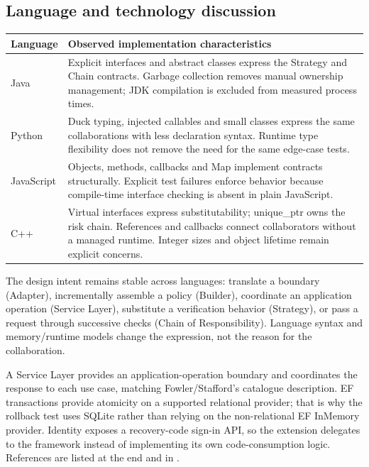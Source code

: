 \documentclass[11pt,a4paper]{article}
\newcommand{\code}[1]{\texttt{\detokenize{#1}}}
\begin{document}
\subsection{Language and technology discussion}
\begin{tabularx}{\linewidth}{@{}p{29mm}L@{}}\toprule
Language & Observed implementation characteristics\\\midrule
Java & Explicit interfaces and abstract classes express the Strategy and Chain contracts. Garbage collection removes manual ownership management; JDK compilation is excluded from measured process times.\\
Python & Duck typing, injected callables and small classes express the same collaborations with less declaration syntax. Runtime type flexibility does not remove the need for the same edge-case tests.\\
JavaScript & Objects, methods, callbacks and Map implement contracts structurally. Explicit test failures enforce behavior because compile-time interface checking is absent in plain JavaScript.\\
C++ & Virtual interfaces express substitutability; unique\_ptr owns the risk chain. References and callbacks connect collaborators without a managed runtime. Integer sizes and object lifetime remain explicit concerns.\\
\bottomrule\end{tabularx}
The design intent remains stable across languages: translate a boundary (Adapter), incrementally assemble a policy (Builder), coordinate an application operation (Service Layer), substitute a verification behavior (Strategy), or pass a request through successive checks (Chain of Responsibility). Language syntax and memory/runtime models change the expression, not the reason for the collaboration.

A Service Layer provides an application-operation boundary and coordinates the response to each use case, matching Fowler/Stafford's catalogue description. EF transactions provide atomicity on a supported relational provider; that is why the rollback test uses SQLite rather than relying on the non-relational EF InMemory provider. Identity exposes a recovery-code sign-in API, so the extension delegates to the framework instead of implementing its own code-consumption logic. References are listed at the end and in \code{REFERENCES.md}.
\clearpage
\end{document}
